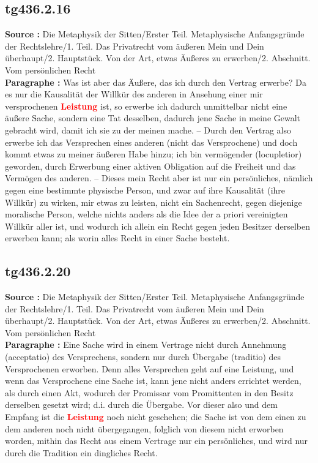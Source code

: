 \documentclass[a4paper,12pt,twoside]{book}
\newcommand{\match}[1]{\textcolor{red}{\textbf{#1}}}
\begin{document}
	\subsection*{tg436.2.16} 
	\textbf{Source : }Die Metaphysik der Sitten/Erster Teil. Metaphysische Anfangsgründe der Rechtslehre/1. Teil. Das Privatrecht vom äußeren Mein und Dein überhaupt/2. Hauptstück. Von der Art, etwas Äußeres zu erwerben/2. Abschnitt. Vom persönlichen Recht\\  
	
	\textbf{Paragraphe : }Was ist aber das Äußere, das ich durch den Vertrag erwerbe? Da es nur die Kausalität der Willkür des anderen in Ansehung einer mir versprochenen \match{Leistung} ist, so erwerbe ich dadurch unmittelbar nicht eine äußere Sache, sondern  eine Tat desselben, dadurch jene Sache in meine Gewalt gebracht wird, damit ich sie zu der meinen mache. – Durch den Vertrag also erwerbe ich das Versprechen eines anderen (nicht das Versprochene) und doch kommt etwas zu meiner äußeren Habe hinzu; ich bin vermögender (locupletior) geworden, durch Erwerbung einer aktiven Obligation auf die Freiheit und das Vermögen des anderen. – Dieses mein Recht aber ist nur ein persönliches, nämlich gegen eine bestimmte physische Person, und zwar auf ihre Kausalität (ihre Willkür) zu wirken, mir etwas zu leisten, nicht ein Sachenrecht, gegen diejenige moralische Person, welche nichts anders als die Idee der a priori vereinigten Willkür aller ist, und wodurch ich allein ein Recht gegen jeden Besitzer derselben erwerben kann; als worin alles Recht in einer Sache besteht. 
	
	\subsection*{tg436.2.20} 
	\textbf{Source : }Die Metaphysik der Sitten/Erster Teil. Metaphysische Anfangsgründe der Rechtslehre/1. Teil. Das Privatrecht vom äußeren Mein und Dein überhaupt/2. Hauptstück. Von der Art, etwas Äußeres zu erwerben/2. Abschnitt. Vom persönlichen Recht\\  
	
	\textbf{Paragraphe : }Eine Sache wird in einem Vertrage nicht durch Annehmung (acceptatio) des Versprechens, sondern nur durch Übergabe (traditio) des Versprochenen erworben. Denn alles Versprechen geht auf eine Leistung, und wenn das Versprochene eine Sache ist, kann jene nicht anders errichtet werden, als durch einen Akt, wodurch der Promissar vom Promittenten in den Besitz derselben gesetzt wird; d.i. durch die Übergabe. Vor dieser also und dem Empfang ist die \match{Leistung} noch nicht geschehen; die Sache ist von dem einen zu dem anderen noch nicht übergegangen, folglich von diesem nicht erworben worden, mithin das Recht aus einem Vertrage nur ein persönliches, und wird nur durch die Tradition ein dingliches Recht. 
	
\end{document}
